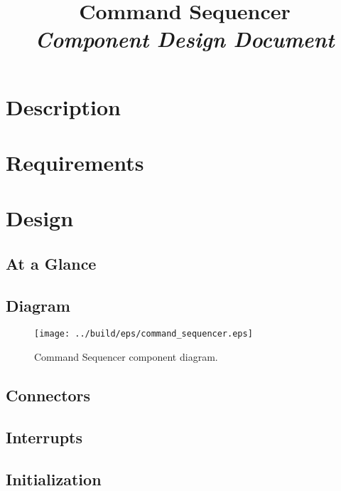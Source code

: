 



\title{\textbf{Command Sequencer} \\
\large\textit{Component Design Document}}
\date{}
\maketitle

\section{Description}


\section{Requirements}


\section{Design}

\subsection{At a Glance}


\subsection{Diagram}
\begin{figure}[H]
  \texttt{[image: ../build/eps/command\_sequencer.eps]}
  \caption{Command Sequencer component diagram.}
\end{figure}

\subsection{Connectors}


\subsection{Interrupts}



\subsection{Initialization}


